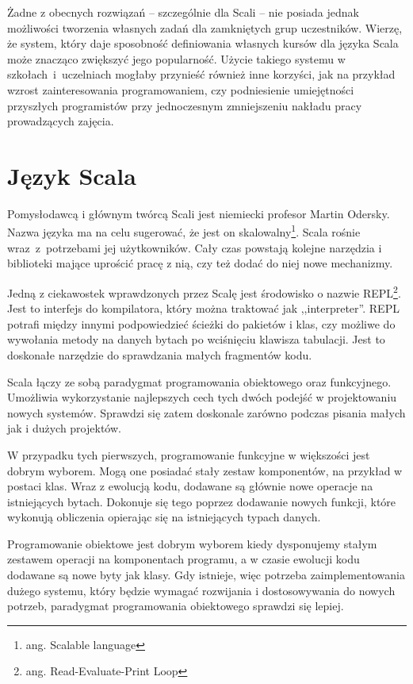 \documentclass[wimgr]{xmgr}
\begin{document}
Żadne z obecnych rozwiązań -- szczególnie dla Scali -- nie posiada jednak możliwości tworzenia własnych zadań dla zamkniętych grup uczestników. Wierzę, że system, który daje sposobność definiowania własnych kursów dla języka Scala może znacząco zwiększyć jego popularność. Użycie takiego systemu w szkołach~i~uczelniach mogłaby przynieść również inne korzyści, jak na przykład wzrost zainteresowania programowaniem, czy podniesienie umiejętności przyszłych programistów przy jednoczesnym zmniejszeniu nakładu pracy prowadzących zajęcia.

\section{Język Scala}

Pomysłodawcą i głównym twórcą Scali jest niemiecki profesor Martin Odersky. Nazwa języka ma na celu sugerować, że jest on skalowalny\footnote{ang. Scalable language}. Scala rośnie wraz~z~potrzebami jej użytkowników. Cały czas powstają kolejne narzędzia i biblioteki mające uprościć pracę z nią, czy też dodać do niej nowe mechanizmy. 

Jedną z ciekawostek wprawdzonych przez Scalę jest środowisko o nazwie REPL\footnote{ang. Read-Evaluate-Print Loop}. Jest to interfejs do kompilatora, który można traktować jak ,,interpreter''. REPL potrafi między innymi podpowiedzieć ścieżki do pakietów i klas, czy możliwe do wywołania metody na danych bytach po wciśnięciu klawisza tabulacji. Jest to doskonałe narzędzie do sprawdzania małych fragmentów kodu.

Scala łączy ze sobą paradygmat programowania obiektowego oraz funkcyjnego. Umożliwia wykorzystanie najlepszych cech tych dwóch podejść w projektowaniu nowych systemów. Sprawdzi się zatem doskonale zarówno podczas pisania małych jak i dużych projektów.

W przypadku tych pierwszych, programowanie funkcyjne w większości jest dobrym wyborem. Mogą one posiadać stały zestaw komponentów, na przykład w postaci klas. Wraz z ewolucją kodu, dodawane są głównie nowe operacje na istniejących bytach. Dokonuje się tego poprzez dodawanie nowych funkcji, które wykonują obliczenia opierając się na istniejących typach danych. 

Programowanie obiektowe jest dobrym wyborem kiedy dysponujemy stałym zestawem operacji na komponentach programu, a w czasie ewolucji kodu dodawane są nowe byty jak klasy. Gdy istnieje, więc potrzeba zaimplementowania dużego systemu, który będzie wymagać rozwijania i dostosowywania do nowych potrzeb, paradygmat programowania obiektowego sprawdzi się lepiej.
\end{document}
